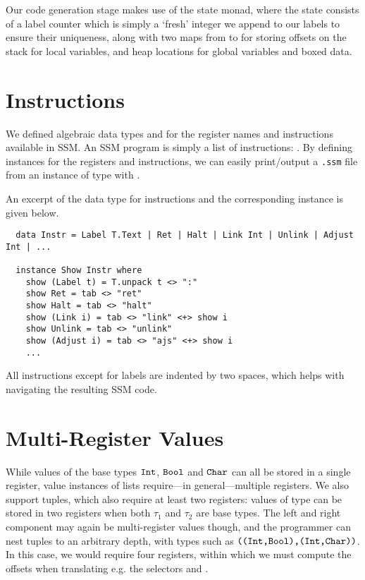 Our code generation stage makes use of the state monad, where the state consists
of a label counter which is simply a `fresh' integer we append to our labels to
ensure their uniqueness, along with two maps from  to
 for storing offsets on the stack for local variables, and heap
locations for global variables and boxed data.


\section{Instructions}

We defined algebraic data types  and  for the
register names and instructions available in SSM. An SSM program is simply a
list of instructions: .
By defining  instances for the registers and instructions, we can
easily print/output a \verb|.ssm| file from an instance of type
\haskell{[Instr]} with .

An excerpt of the data type for instructions and the corresponding 
instance is given below.

\begin{verbatim}
  data Instr = Label T.Text | Ret | Halt | Link Int | Unlink | Adjust Int | ...

  instance Show Instr where
    show (Label t) = T.unpack t <> ":"
    show Ret = tab <> "ret"
    show Halt = tab <> "halt"
    show (Link i) = tab <> "link" <+> show i
    show Unlink = tab <> "unlink"
    show (Adjust i) = tab <> "ajs" <+> show i
    ...
\end{verbatim}

All instructions except for labels are indented by two spaces, which helps with
navigating the resulting SSM code.



\section{Multi-Register Values} \label{sec:multi-reg-vals}

While values of the base types $\texttt{Int}$, $\texttt{Bool}$ and $\texttt{Char}$ can all be
stored in a single register, value instances of lists
require---in general---multiple registers.
We also support tuples, which also require at least two registers:
values of type  can be stored in two registers
when both $\tau_1$ and $\tau_2$ are base types.
The left and right component may again be multi-register values though, and
the programmer can nest tuples to an arbitrary depth, with types such as
$\texttt{(}\texttt{(}\texttt{Int}\texttt{,}\texttt{Bool}\texttt{)}\texttt{,}\texttt{(}\texttt{Int}\texttt{,}\texttt{Char}\texttt{)}\texttt{)}$. In this case, we would
require four registers, within which we must compute the offsets when
translating e.g. the selectors  and .

